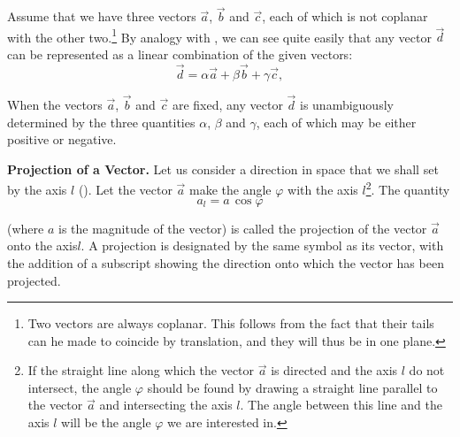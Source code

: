 Assume that we have three vectors $\vec{a}$, $\vec{b}$ and $\vec{c}$, each of which is not coplanar with the other two.\footnote{Two vectors are always coplanar. This follows from the fact that their tails can he made to coincide by translation, and they will thus be in one plane.} By analogy with , we can see quite easily that any vector $\vec{d}$ can be represented as a linear combination of the given vectors:
\begin{equation}\label{eq:1_6}
\vec{d} = \alpha\vec{a} + \beta\vec{b} + \gamma\vec{c},
\end{equation}

\noindent
When the vectors $\vec{a}$, $\vec{b}$ and $\vec{c}$ are fixed, any vector $\vec{d}$ is unambiguously determined by the three quantities $\alpha$, $\beta$ and $\gamma$, each of which may be either positive or negative.

\textbf{Projection of a Vector.} Let us consider a direction in space that we shall set by the axis $l$ (). Let the vector $\vec{a}$ make the angle $\varphi$ with the axis $l$\footnote{If the straight line along which the vector $\vec{a}$ is directed and the axis $l$ do not intersect, the angle $\varphi$ should be found by drawing a straight line parallel to the vector $\vec{a}$ and intersecting the axis $l$. The angle between this line and the axis $l$ will be the angle $\varphi$ we are interested in.}. The quantity
\begin{equation}\label{eq:1_7}
a_l = a\, \cos\varphi
\end{equation}

\noindent
(where $a$ is the magnitude of the vector) is called the projection of the vector $\vec{a}$ onto the axis$l$. A projection is designated by the same symbol as its vector, with the addition of a subscript showing the direction onto which the vector has been projected.

